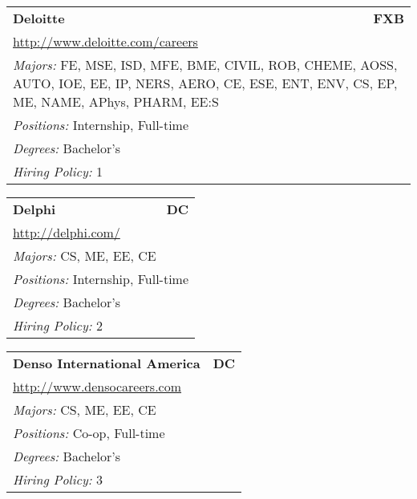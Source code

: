 \documentclass[twoside]{article}
\begin{document}
\begin{center}
\begin{multicols}{3}
\begin{FlushLeft}
\begin{minipage}{\columnwidth}
\end{minipage}
 
\begin{minipage}{\columnwidth}\begin{tabularx}{.95\columnwidth}{Xr}
                 {\Large\bf Deloitte} & {\Large\bf FXB}\\
    \multicolumn{2}{p{.95\columnwidth}}{\url{http://www.deloitte.com/careers}}\\
    \multicolumn{2}{p{.95\columnwidth}}{\emph{Majors:} FE, MSE, ISD, MFE, BME, CIVIL, ROB, CHEME, AOSS, AUTO, IOE, EE, IP, NERS, AERO, CE, ESE, ENT, ENV, CS, EP, ME, NAME, APhys, PHARM, EE:S}\\
    \multicolumn{2}{p{.95\columnwidth}}{\emph{Positions:} Internship, Full-time}\\
    \multicolumn{2}{p{.95\columnwidth}}{\emph{Degrees:} Bachelor's}\\
    \multicolumn{2}{p{.95\columnwidth}}{\emph{Hiring Policy:} 1}\\
    \end{tabularx}
    
\end{minipage}
 
\begin{minipage}{\columnwidth}\begin{tabularx}{.95\columnwidth}{Xr}
                 {\Large\bf Delphi} & {\Large\bf DC}\\
    \multicolumn{2}{p{.95\columnwidth}}{\url{http://delphi.com/}}\\
    \multicolumn{2}{p{.95\columnwidth}}{\emph{Majors:} CS, ME, EE, CE}\\
    \multicolumn{2}{p{.95\columnwidth}}{\emph{Positions:} Internship, Full-time}\\
    \multicolumn{2}{p{.95\columnwidth}}{\emph{Degrees:} Bachelor's}\\
    \multicolumn{2}{p{.95\columnwidth}}{\emph{Hiring Policy:} 2}\\
    \end{tabularx}
    
\end{minipage}
 
\begin{minipage}{\columnwidth}\begin{tabularx}{.95\columnwidth}{Xr}
                 {\Large\bf Denso International America} & {\Large\bf DC}\\
    \multicolumn{2}{p{.95\columnwidth}}{\url{http://www.densocareers.com}}\\
    \multicolumn{2}{p{.95\columnwidth}}{\emph{Majors:} CS, ME, EE, CE}\\
    \multicolumn{2}{p{.95\columnwidth}}{\emph{Positions:} Co-op, Full-time}\\
    \multicolumn{2}{p{.95\columnwidth}}{\emph{Degrees:} Bachelor's}\\
    \multicolumn{2}{p{.95\columnwidth}}{\emph{Hiring Policy:} 3}\\
    \end{tabularx}
    

\end{minipage}
\end{FlushLeft}
\end{multicols}
\end{center}
\end{document}
